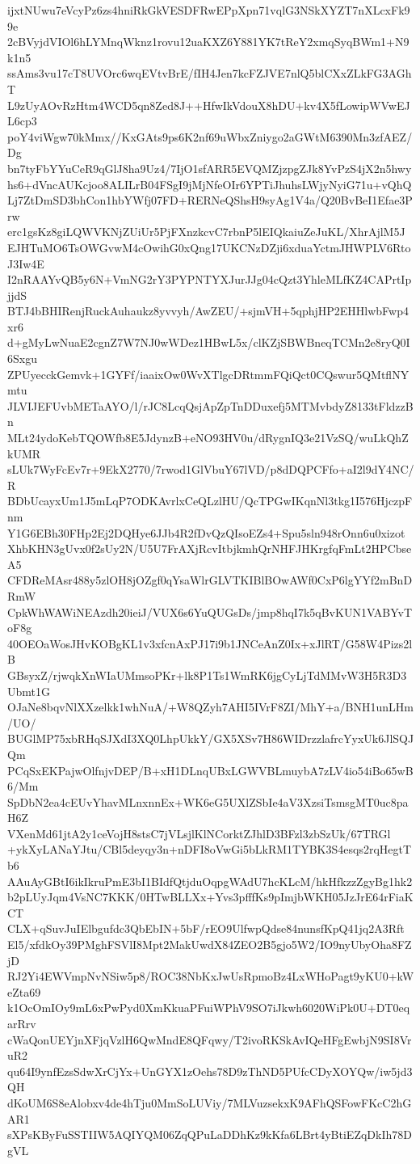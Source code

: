 ijxtNUwu7eVcyPz6zs4hniRkGkVESDFRwEPpXpn71vqlG3NSkXYZT7nXLcxFk99e
2cBVyjdVIOl6hLYMnqWknz1rovu12uaKXZ6Y881YK7tReY2xmqSyqBWm1+N9k1n5
ssAms3vu17cT8UVOrc6wqEVtvBrE/fIH4Jen7kcFZJVE7nlQ5blCXxZLkFG3AGhT
L9zUyAOvRzHtm4WCD5qn8Zed8J++HfwIkVdouX8hDU+kv4X5fLowipWVwEJL6cp3
poY4viWgw70kMmx//KxGAts9ps6K2nf69uWbxZniygo2aGWtM6390Mn3zfAEZ/Dg
bn7tyFbYYuCeR9qGlJ8ha9Uz4/7IjO1sfARR5EVQMZjzpgZJk8YvPzS4jX2n5hwy
hs6+dVncAUKcjoo8ALILrB04FSgI9jMjNfeOIr6YPTiJhuhsLWjyNyiG71u+vQhQ
Lj7ZtDmSD3bhCon1hbYWfj07FD+RERNeQShsH9syAg1V4a/Q20BvBeI1Efae3Prw
erc1gsKz8giLQWVKNjZUiUr5PjFXnzkcvC7rbnP5lEIQkaiuZeJuKL/XhrAjlM5J
EJHTuMO6TsOWGvwM4cOwihG0xQng17UKCNzDZji6xduaYctmJHWPLV6RtoJ3Iw4E
I2nRAAYvQB5y6N+VmNG2rY3PYPNTYXJurJJg04cQzt3YhleMLfKZ4CAPrtIpjjdS
BTJ4bBHIRenjRuckAuhaukz8yvvyh/AwZEU/+sjmVH+5qphjHP2EHHlwbFwp4xr6
d+gMyLwNuaE2cgnZ7W7NJ0wWDez1HBwL5x/clKZjSBWBneqTCMn2e8ryQ0I6Sxgu
ZPUyecckGemvk+1GYFf/iaaixOw0WvXTlgcDRtmmFQiQct0CQswur5QMtflNYmtu
JLVIJEFUvbMETaAYO/l/rJC8LcqQsjApZpTnDDuxefj5MTMvbdyZ8133tFldzzBn
MLt24ydoKebTQOWfb8E5JdynzB+eNO93HV0u/dRygnIQ3e21VzSQ/wuLkQhZkUMR
sLUk7WyFcEv7r+9EkX2770/7rwod1GlVbuY67lVD/p8dDQPCFfo+aI2l9dY4NC/R
BDbUcayxUm1J5mLqP7ODKAvrlxCeQLzlHU/QcTPGwIKqnNl3tkg1I576HjczpFnm
Y1G6EBh30FHp2Ej2DQHye6JJb4R2fDvQzQIsoEZs4+Spu5sln948rOnn6u0xizot
XhbKHN3gUvx0f2sUy2N/U5U7FrAXjRcvItbjkmhQrNHFJHKrgfqFmLt2HPCbseA5
CFDReMAsr488y5zlOH8jOZgf0qYsaWlrGLVTKIBlBOwAWf0CxP6lgYYf2mBnDRmW
CpkWhWAWiNEAzdh20ieiJ/VUX6s6YuQUGsDs/jmp8hqI7k5qBvKUN1VABYvToF8g
40OEOaWosJHvKOBgKL1v3xfcnAxPJ17i9b1JNCeAnZ0Ix+xJlRT/G58W4Pizs2lB
GBsyxZ/rjwqkXnWIaUMmsoPKr+lk8P1Ts1WmRK6jgCyLjTdMMvW3H5R3D3Ubmt1G
OJaNe8bqvNlXXzelkk1whNuA/+W8QZyh7AHI5IVrF8ZI/MhY+a/BNH1unLHm/UO/
BUGlMP75xbRHqSJXdI3XQ0LhpUkkY/GX5XSv7H86WIDrzzlafrcYyxUk6JlSQJQm
PCqSxEKPajwOlfnjvDEP/B+xH1DLnqUBxLGWVBLmuybA7zLV4io54iBo65wB6/Mm
SpDbN2ea4cEUvYhavMLnxnnEx+WK6eG5UXlZSbIe4aV3XzsiTsmsgMT0uc8paH6Z
VXenMd61jtA2y1ceVojH8stsC7jVLsjlKlNCorktZJhlD3BFzl3zbSzUk/67TRGl
+ykXyLANaYJtu/CBl5deyqy3n+nDFI8oVwGi5bLkRM1TYBK3S4esqs2rqHegtTb6
AAuAyGBtI6ikIkruPmE3bI1BIdfQtjduOqpgWAdU7hcKLcM/hkHfkzzZgyBg1hk2
b2pLUyJqm4VsNC7KKK/0HTwBLLXx+Yvs3pfffKs9pImjbWKH05JzJrE64rFiaKCT
CLX+qSuvJuIElbgufdc3QbEbIN+5bF/rEO9UlfwpQdse84nunsfKpQ41jq2A3Rft
El5/xfdkOy39PMghFSVlI8Mpt2MakUwdX84ZEO2B5gjo5W2/IO9nyUbyOha8FZjD
RJ2Yi4EWVmpNvNSiw5p8/ROC38NbKxJwUsRpmoBz4LxWHoPagt9yKU0+kWeZta69
k1OcOmIOy9mL6xPwPyd0XmKkuaPFuiWPhV9SO7iJkwh6020WiPk0U+DT0eqarRrv
cWaQonUEYjnXFjqVzlH6QwMndE8QFqwy/T2ivoRKSkAvIQeHFgEwbjN9SI8VruR2
qu64I9ynfEzsSdwXrCjYx+UnGYX1zOehs78D9zThND5PUfcCDyXOYQw/iw5jd3QH
dKoUM6S8eAlobxv4de4hTju0MmSoLUViy/7MLVuzsekxK9AFhQSFowFKcC2hGAR1
sXPsKByFuSSTIIW5AQIYQM06ZqQPuLaDDhKz9kKfa6LBrt4yBtiEZqDkIh78DgVL
